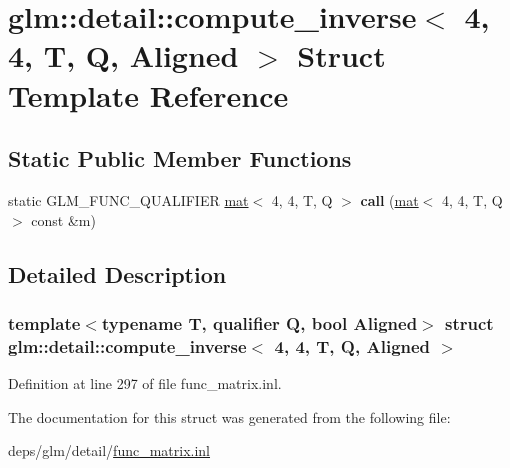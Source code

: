 \hypertarget{structglm_1_1detail_1_1compute__inverse_3_014_00_014_00_01T_00_01Q_00_01Aligned_01_4}{}\section{glm\+:\+:detail\+:\+:compute\+\_\+inverse$<$ 4, 4, T, Q, Aligned $>$ Struct Template Reference}
\label{structglm_1_1detail_1_1compute__inverse_3_014_00_014_00_01T_00_01Q_00_01Aligned_01_4}
\subsection*{Static Public Member Functions}
\begin{DoxyCompactItemize}
\item 
\mbox{\label{structglm_1_1detail_1_1compute__inverse_3_014_00_014_00_01T_00_01Q_00_01Aligned_01_4_a113ff9d7721d4a608e8d54fdf4e02fc6}} 
static G\+L\+M\+\_\+\+F\+U\+N\+C\+\_\+\+Q\+U\+A\+L\+I\+F\+I\+ER \hyperlink{structglm_1_1mat}{mat}$<$ 4, 4, T, Q $>$ {\bfseries call} (\hyperlink{structglm_1_1mat}{mat}$<$ 4, 4, T, Q $>$ const \&m)
\end{DoxyCompactItemize}


\subsection{Detailed Description}
\subsubsection*{template$<$typename T, qualifier Q, bool Aligned$>$\newline
struct glm\+::detail\+::compute\+\_\+inverse$<$ 4, 4, T, Q, Aligned $>$}



Definition at line 297 of file func\+\_\+matrix.\+inl.



The documentation for this struct was generated from the following file\+:\begin{DoxyCompactItemize}
\item 
deps/glm/detail/\hyperlink{func__matrix_8inl}{func\+\_\+matrix.\+inl}\end{DoxyCompactItemize}
